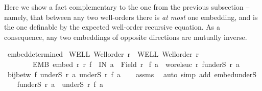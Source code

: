 \begin{isabellebody}
{}
\isamarkuptrue%
%
\endisatagdocument
{\isafolddocument}%
%
\isadelimdocument
%
\endisadelimdocument
%
\begin{isamarkuptext}%
Here we show a fact complementary to the one from the previous subsection -- namely,
that between any two well-orders there is {\em at most} one embedding, and is the one
definable by the expected well-order recursive equation.  As a consequence, any two
embeddings of opposite directions are mutually inverse.%
\end{isamarkuptext}\isamarkuptrue%
\isamarkupfalse%
\ embed{\isacharunderscore}{\kern0pt}determined{\isacharcolon}{\kern0pt}\isanewline
{}\ WELL{\isacharcolon}{\kern0pt}\ {\isachardoublequoteopen}Well{\isacharunderscore}{\kern0pt}order\ r{\isachardoublequoteclose}\ \ WELL{\isacharprime}{\kern0pt}{\isacharcolon}{\kern0pt}\ {\isachardoublequoteopen}Well{\isacharunderscore}{\kern0pt}order\ r{\isacharprime}{\kern0pt}{\isachardoublequoteclose}\ \isanewline
\ \ \ \ \ \ \ \ EMB{\isacharcolon}{\kern0pt}\ {\isachardoublequoteopen}embed\ r\ r{\isacharprime}{\kern0pt}\ f{\isachardoublequoteclose}\ \ IN{\isacharcolon}{\kern0pt}\ {\isachardoublequoteopen}a\ {\isasymin}\ Field\ r{\isachardoublequoteclose}\isanewline
{}\ {\isachardoublequoteopen}f\ a\ {\isacharequal}{\kern0pt}\ wo{\isacharunderscore}{\kern0pt}rel{\isachardot}{\kern0pt}suc\ r{\isacharprime}{\kern0pt}\ {\isacharparenleft}{\kern0pt}f{\isacharbackquote}{\kern0pt}{\isacharparenleft}{\kern0pt}underS\ r\ a{\isacharparenright}{\kern0pt}{\isacharparenright}{\kern0pt}{\isachardoublequoteclose}\isanewline
%
\isadelimproof
%
\endisadelimproof
%
\isatagproof
{}\isamarkupfalse%
{\isacharminus}{\kern0pt}\isanewline
\ \ \isamarkupfalse%
\ {\isachardoublequoteopen}bij{\isacharunderscore}{\kern0pt}betw\ f\ {\isacharparenleft}{\kern0pt}underS\ r\ a{\isacharparenright}{\kern0pt}\ {\isacharparenleft}{\kern0pt}underS\ r{\isacharprime}{\kern0pt}\ {\isacharparenleft}{\kern0pt}f\ a{\isacharparenright}{\kern0pt}{\isacharparenright}{\kern0pt}{\isachardoublequoteclose}\isanewline
\ \ \isamarkupfalse%
\ assms\ \isamarkupfalse%
\ {\isacharparenleft}{\kern0pt}auto\ simp\ add{\isacharcolon}{\kern0pt}\ embed{\isacharunderscore}{\kern0pt}underS{\isacharparenright}{\kern0pt}\isanewline
\ \ \isamarkupfalse%
\ {\isachardoublequoteopen}f{\isacharbackquote}{\kern0pt}{\isacharparenleft}{\kern0pt}underS\ r\ a{\isacharparenright}{\kern0pt}\ {\isacharequal}{\kern0pt}\ underS\ r{\isacharprime}{\kern0pt}\ {\isacharparenleft}{\kern0pt}f\ a{\isacharparenright}{\kern0pt}{\isachardoublequoteclose}\isanewline

\end{isabellebody}
